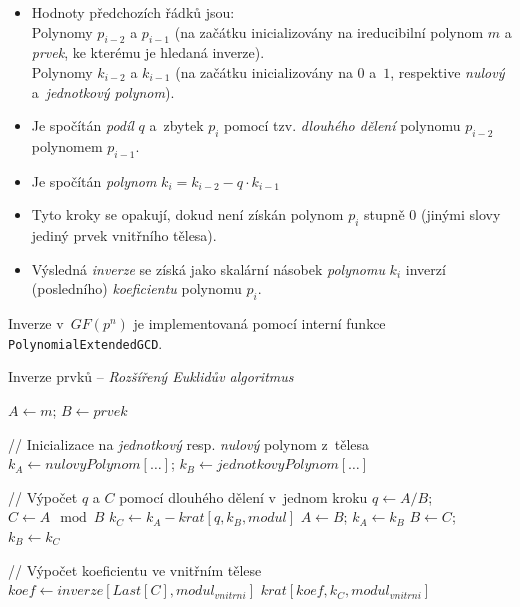 \documentclass[thesis=M,czech,hidelinks]{FITthesis}[2012/06/26]
\newcommand{\0}{{\textcolor[gray]{0.75}{0}}}
\newenvironment{algoritmus}{
    \floatname{algorithm}{Algoritmus}
    \begin{algorithm}
}{\end{algorithm}}
\begin{document}
\begin{itemize}
    \item Hodnoty předchozích řádků jsou:\\
        \hspace*{0.6cm}Polynomy $p_{i-2}$ a $p_{i-1}$ (na začátku inicializovány
            na ireducibilní polynom $m$ a \emph{prvek}, ke kterému je hledaná
            inverze). \\
        \hspace*{0.6cm}Polynomy $k_{i-2}$ a $k_{i-1}$ (na začátku inicializovány
            na $0$ a~$1$, respektive \emph{nulový} a~\emph{jednotkový
            polynom}).

    \item Je spočítán \emph{podíl} $q$ a~zbytek $p_i$ pomocí tzv. \emph{dlouhého
        dělení} polynomu $p_{i-2}$ polynomem $p_{i-1}$.

    \item Je spočítán \emph{polynom} $k_i = k_{i-2} - q \cdot k_{i-1} $

    \item Tyto kroky se opakují, dokud není získán polynom $p_i$ stupně $0$
        (jinými slovy jediný prvek vnitřního tělesa).

    \item Výsledná \emph{inverze} se získá jako skalární násobek \emph{polynomu}
        $k_i$ inverzí (posledního) \emph{koeficientu} polynomu $p_i$.
\end{itemize}

Inverze v~$GF(p^n)$ je implementovaná pomocí interní funkce
\texttt{Polynomial\-ExtendedGCD}.

\begin{algoritmus}[!ht]
    \caption{Inverze prvků -- \emph{Rozšířený Euklidův algoritmus}}
    \begin{algorithmic}[1]
        \State $ A \gets m $; $ B \gets prvek $

        // Inicializace na \emph{jednotkový} resp. \emph{nulový} polynom z~tělesa
        \State $ k_A \gets nulovyPolynom[\ldots] $;
            $ k_B \gets jednotkovyPolynom[\ldots] $

            // Výpočet $q$ a $C$ pomocí dlouhého dělení v~jednom kroku
            \State $ q   \gets A/B $; $ C   \gets A \mod B $
            \State $ k_C \gets k_A - krat[ q, k_B, modul ] $
            \State $ A \gets B$; $k_A \gets k_B$
            \State $ B \gets C$; $k_B \gets k_C$
        \EndWhile

        // Výpočet koeficientu ve vnitřním tělese
        \State $koef \gets inverze[ Last[C], modul_{vnitrni} ]$
        \State \Return $krat[ koef, k_C, modul_{vnitrni} ]$
     \EndFunction
    \end{algorithmic}
    \label{alg_eea}
\end{algoritmus}
\end{document}
